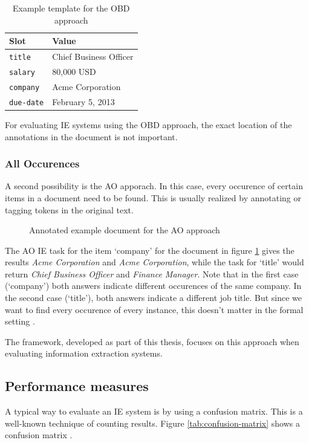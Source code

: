 \begin{table}[H]
\centering
\begin{tabular*}{\textwidth}{ll}
	\toprule
	Slot & Value \\
	\midrule
	\texttt{title} & Chief Business Officer \\
	\texttt{salary} & 80,000 USD \\
	\texttt{company} & Acme Corporation \\
	\texttt{due-date} & February 5, 2013 \\
	\bottomrule
\end{tabular*}
\caption{Example template for the \gls{OBD} approach}
\label{tbl:example-obd}
\end{table}

For evaluating \gls{IE} systems using the \gls{OBD} approach, the exact location of the annotations in the document is not important. \cite{Sitter:2004}

\subsubsection{All Occurences}
A second possibility is the \gls{AO} apporach. In this case, every occurence of certain items in a document need to be found. This is usually realized by annotating or tagging tokens in the original text. \cite{Sitter:2004}

\begin{figure}[H]

\caption{Annotated example document for the \gls{AO} approach}
\label{fig:example-ao}
\end{figure}

The \gls{AO} \gls{IE} task for the item \enquote*{company} for the document in figure \ref{fig:example-ao} gives the results \textit{Acme Corporation} and \textit{Acme Corporation}, while the task for \enquote*{title} would return \textit{Chief Business Officer} and \textit{Finance Manager}. Note that in the first case (\enquote*{company}) both answers indicate different occurences of the same company. In the second case (\enquote*{title}), both answers indicate a different job title. But since we want to find every occurence of every instance, this doesn't matter in the formal setting \cite{Sitter:2004}.

The framework, developed as part of this thesis, focuses on this approach when evaluating information extraction systems.

\newpage
\subsection{Performance measures}
A typical way to evaluate an IE system is by using a confusion matrix. This is a well-known
technique of counting results. Figure \ref{tab:confusion-matrix} shows a confusion matrix \cite{Sitter:2004}.

